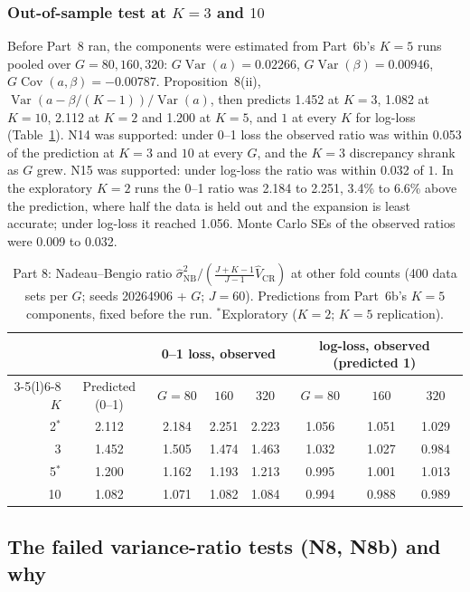 \documentclass[11pt]{amsart}
\theoremstyle{plain}
\theoremstyle{definition}
\theoremstyle{remark}
\newcommand{\Var}{\operatorname{Var}}
\newcommand{\Cov}{\operatorname{Cov}}
\newcommand{\VCR}{\hat V_{\mathrm{CR}}}
\newcommand{\VNB}{\hat\sigma^2_{\mathrm{NB}}}
\newcommand{\fac}{\tfrac{J+K-1}{J-1}}
\begin{document}
\subsubsection*{Out-of-sample test at $K=3$ and $10$} Before Part~8 ran, the components were estimated from Part~6b's $K=5$ runs pooled over $G=80,160,320$: $G\Var(a)=0.02266$, $G\Var(\beta)=0.00946$, $G\Cov(a,\beta)=-0.00787$. Proposition~8(ii), $\Var(a-\beta/(K-1))/\Var(a)$, then predicts 1.452 at $K=3$, 1.082 at $K=10$, 2.112 at $K=2$ and 1.200 at $K=5$, and $1$ at every $K$ for log-loss (Table~\ref{tab:kfold}). N14 was supported: under 0--1 loss the observed ratio was within 0.053 of the prediction at $K=3$ and $10$ at every $G$, and the $K=3$ discrepancy shrank as $G$ grew. N15 was supported: under log-loss the ratio was within 0.032 of $1$. In the exploratory $K=2$ runs the 0--1 ratio was 2.184 to 2.251, 3.4\% to 6.6\% above the prediction, where half the data is held out and the expansion is least accurate; under log-loss it reached 1.056. Monte Carlo SEs of the observed ratios were 0.009 to 0.032.

\begin{table}[tbp]
\centering\footnotesize
\caption{Part 8: Nadeau--Bengio ratio $\VNB/(\fac\VCR)$ at other fold counts (400 data sets per $G$; seeds 20264906 + $G$; $J=60$). Predictions from Part~6b's $K=5$ components, fixed before the run. $^{*}$Exploratory ($K=2$; $K=5$ replication).}\label{tab:kfold}
\begin{tabular}{@{}r c c c c c c c@{}}
\toprule
 & & \multicolumn{3}{c}{0--1 loss, observed} & \multicolumn{3}{c}{log-loss, observed (predicted 1)}\\
\cmidrule(lr){3-5}\cmidrule(l){6-8}
$K$ & Predicted (0--1) & $G=80$ & $160$ & $320$ & $G=80$ & $160$ & $320$\\
\midrule
2$^{*}$ & 2.112 & 2.184 & 2.251 & 2.223 & 1.056 & 1.051 & 1.029 \\
3 & 1.452 & 1.505 & 1.474 & 1.463 & 1.032 & 1.027 & 0.984 \\
5$^{*}$ & 1.200 & 1.162 & 1.193 & 1.213 & 0.995 & 1.001 & 1.013 \\
10 & 1.082 & 1.071 & 1.082 & 1.084 & 0.994 & 0.988 & 0.989 \\
\bottomrule
\end{tabular}
\end{table}

\subsection{The failed variance-ratio tests (N8, N8b) and why}
\end{document}
